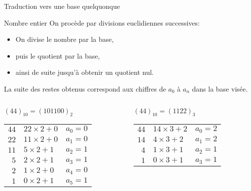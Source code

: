 \begin{frame}{Traduction vers une base quelquonque}

  \begin{block}{Nombre entier}
    On procède par divisions euclidiennes successives:
    \begin{itemize}
    \item On divise le nombre par la base,
    \item puis le quotient par la base,
    \item ainsi de suite jusqu’à obtenir un quotient nul.
    \end{itemize}
    La suite des restes obtenus correspond aux chiffres de $a_0$ à $a_n$ dans la base visée.
  \end{block}


      \begin{columns}[t]
        \begin{column}{0.48\textwidth}
          \begin{exampleblock}{$(44)_{10} = (101100)_2$}
        \begin{tabular}{r@{ = }ll}
         $44$ & $22\times 2 + 0$ & $ a_0 = 0$ \\
         $22$ & $11\times 2 + 0$ & $a_1 = 0$ \\
         $11$ & $5\times 2 + 1$ & $a_2 = 1$ \\
         $5$ & $2\times 2 + 1$ & $a_3 = 1$ \\
         $2$ & $1\times 2 + 0$ & $a_4 = 0$ \\
         $1$ & $0\times 2 + 1$ & $a_5 = 1$ \\
        \end{tabular}
      \end{exampleblock}
      \end{column}


  \begin{column}{0.48\textwidth}
    \begin{exampleblock}{$(44)_{10} = (1122)_3$}
      \begin{tabular}{r@{ = }ll}
         $44$ & $14 \times 3 + 2$ & $ a_0 = 2$ \\
         $14$ & $4\times 3 + 2$ & $a_1 = 2$ \\
         $4$ & $1\times 3 + 1$ & $a_2 = 1$ \\
         $1$ & $0\times 3 + 1$ & $a_3 = 1$ \\
      \end{tabular}
    \end{exampleblock}
  \end{column}
  \end{columns}

\end{frame}



